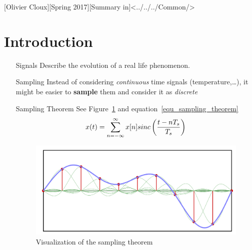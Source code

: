 \documentclass[11pt,a4paper]{article}
\begin{document}
[Olivier Cloux][Spring 2017][Summary in]<../../../Common/>
\setlength{\abovedisplayskip}{0.1cm}
\setlength{\belowdisplayskip}{0.1cm}
\setlength{\multicolsep}{0pt}
\setlength{\columnsep}{-80pt}
\tableofcontents
\newpage
\section{Introduction}
\begin{itemize}
    \setlength\itemsep{-0.2em}

    \item[Signals] Describe the evolution of a real life phenomenon.

    \item[Sampling] Instead of considering \textit{continuous} time signals (temperature,\ldots), it might be easier to \textbf{sample} them and consider it as \textit{discrete}
    
    \item[Sampling Theorem] See Figure~\ref{fig_sampling_theorem} and equation~\ref{equ_sampling_theorem}
        \begin{equation}
            x(t) = \somme{\infty}{n=-\infty} x[n] sinc\left(\frac{t-nT_s}{T_s}\right)%
            \label{equ_sampling_theorem}
        \end{equation}
        \begin{figure}
            \centering
            \includegraphics[scale=0.2]{images/sampling_theorem}
            \caption{Visualization of the sampling theorem}%
            \label{fig_sampling_theorem}
        \end{figure}    
   

\end{itemize}
\end{document}
